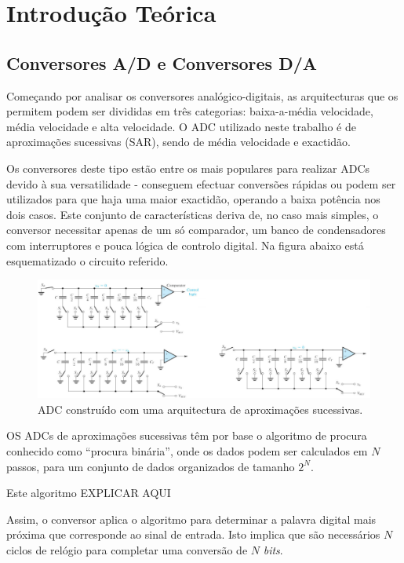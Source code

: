 \documentclass[11pt]{article}
\numberwithin{equation}{section}
\begin{document}
\section{Introdução Teórica}
\subsection{Conversores A/D e Conversores D/A}

Começando por analisar os conversores analógico-digitais, as arquitecturas que os permitem podem ser divididas em três categorias: baixa-a-média velocidade, média velocidade e alta velocidade. O ADC utilizado neste trabalho é de aproximações sucessivas (SAR), sendo de média velocidade e exactidão. 

Os conversores deste tipo estão entre os mais populares para realizar ADCs devido à sua versatilidade - conseguem efectuar conversões rápidas ou podem ser utilizados para que haja uma maior exactidão, operando a baixa potência nos dois casos. Este conjunto de características deriva de, no caso mais simples, o conversor necessitar apenas de um só comparador, um banco de condensadores com interruptores e pouca lógica de controlo digital. Na figura abaixo está esquematizado o circuito referido.

\begin{figure}[h]
	\centering
	\includegraphics[keepaspectratio=true, scale=0.45]{./teoricas/SAR_1}
	\caption{ADC construído com uma arquitectura de aproximações sucessivas.}
	\vspace{-0.8em}
\end{figure}

OS ADCs de aproximações sucessivas têm por base o algoritmo de procura conhecido como ``procura binária'', onde os dados podem ser calculados em $N$ passos, para um conjunto de dados organizados de tamanho $2^N$.

Este algoritmo EXPLICAR AQUI

Assim, o conversor aplica o algoritmo para determinar a palavra digital mais próxima que corresponde ao sinal de entrada. Isto implica que são necessários $N$ ciclos de relógio para completar uma conversão de $N$ \textit{bits}.
\end{document}
